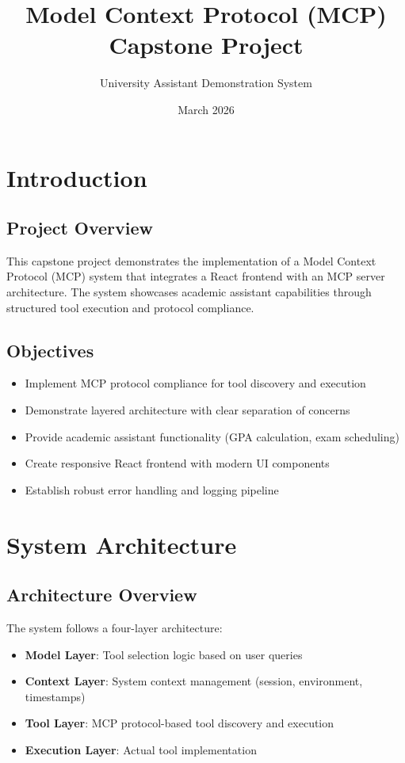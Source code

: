 \documentclass[12pt, a4paper]{report}
\title{Model Context Protocol (MCP) Capstone Project}
\author{University Assistant Demonstration System}
\date{March 2026}
\begin{document}
\maketitle
\tableofcontents
\newpage

\chapter{Introduction}

\section{Project Overview}
This capstone project demonstrates the implementation of a Model Context Protocol (MCP) system that integrates a React frontend with an MCP server architecture. The system showcases academic assistant capabilities through structured tool execution and protocol compliance.

\section{Objectives}
\begin{itemize}
    \item Implement MCP protocol compliance for tool discovery and execution
    \item Demonstrate layered architecture with clear separation of concerns
    \item Provide academic assistant functionality (GPA calculation, exam scheduling)
    \item Create responsive React frontend with modern UI components
    \item Establish robust error handling and logging pipeline
\end{itemize}

\chapter{System Architecture}

\section{Architecture Overview}
The system follows a four-layer architecture:
\begin{itemize}
    \item \textbf{Model Layer}: Tool selection logic based on user queries
    \item \textbf{Context Layer}: System context management (session, environment, timestamps)
    \item \textbf{Tool Layer}: MCP protocol-based tool discovery and execution
    \item \textbf{Execution Layer}: Actual tool implementation
\end{itemize}
\end{document}

